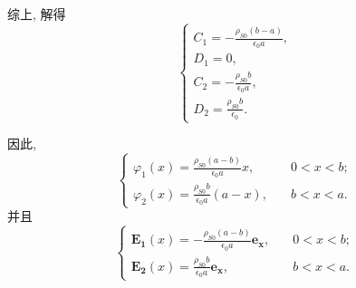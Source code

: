 \begin{exampleprob}
\begin{solution}
        综上, 解得
        \begin{equation*}
            \begin{cases}
                C_1=-\frac{\rho_{S0}(b-a)}{\epsilon_0a}, \\
                D_1=0,                                   \\
                C_2=-\frac{\rho_{S0}b}{\epsilon_0a},     \\
                D_2=\frac{\rho_{S0}b}{\epsilon_0}.
            \end{cases}
        \end{equation*}

        因此,
        \begin{equation*}
            \begin{cases}
                \varphi_1(x)=\frac{\rho_{S0}(a-b)}{\epsilon_0a}x, & \quad 0<x<b; \\
                \varphi_2(x)=\frac{\rho_{S0}b}{\epsilon_0a}(a-x), & \quad b<x<a.
            \end{cases}
        \end{equation*}
        并且
        \begin{equation*}
            \begin{cases}
                \bm{E_1}(x)=-\frac{\rho_{S0}(a-b)}{\epsilon_0a}\bm{e_x}, & \quad 0<x<b; \\
                \bm{E_2}(x)=\frac{\rho_{S0}b}{\epsilon_0a}\bm{e_x},      & \quad b<x<a.
            \end{cases}
        \end{equation*}
    \end{solution}
\end{exampleprob}
